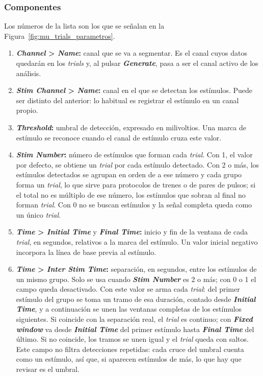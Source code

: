 \documentclass[11pt,a4paper]{article}
\begin{document}
    \subsubsection*{Componentes}
    Los n\'umeros de la lista son los que se se\~nalan en la Figura~\ref{fig:mu_trials_parametros}.
    \begin{enumerate}[label=(\arabic*)]
        \item \textbf{\textit{Channel} > \textit{Name}:} canal que se va a segmentar. Es el canal cuyos datos quedar\'an en los \textit{trials} y, al pulsar \textbf{\textit{Generate}}, pasa a ser el canal activo de los an\'alisis.
        \item \textbf{\textit{Stim Channel} > \textit{Name}:} canal en el que se detectan los est\'imulos. Puede ser distinto del anterior: lo habitual es registrar el est\'imulo en un canal propio.
        \item \textbf{\textit{Threshold}:} umbral de detecci\'on, expresado en milivoltios. Una marca de est\'imulo se reconoce cuando el canal de est\'imulo cruza este valor.
        \item \textbf{\textit{Stim Number}:} n\'umero de est\'imulos que forman cada \textit{trial}. Con 1, el valor por defecto, se obtiene un \textit{trial} por cada est\'imulo detectado. Con 2 o m\'as, los est\'imulos detectados se agrupan en orden de a ese n\'umero y cada grupo forma un \textit{trial}, lo que sirve para protocolos de trenes o de pares de pulsos; si el total no es m\'ultiplo de ese n\'umero, los est\'imulos que sobran al final no forman \textit{trial}. Con 0 no se buscan est\'imulos y la se\~nal completa queda como un \'unico \textit{trial}.
        \item \textbf{\textit{Time} > \textit{Initial Time}} y \textbf{\textit{Final Time}:} inicio y fin de la ventana de cada \textit{trial}, en segundos, relativos a la marca del est\'imulo. Un valor inicial negativo incorpora la l\'inea de base previa al est\'imulo.
        \item \textbf{\textit{Time} > \textit{Inter Stim Time}:} separaci\'on, en segundos, entre los est\'imulos de un mismo grupo. Solo se usa cuando \textbf{\textit{Stim Number}} es 2 o m\'as; con 0 o 1 el campo queda desactivado. Con este valor se arma cada \textit{trial}: del primer est\'imulo del grupo se toma un tramo de esa duraci\'on, contado desde \textbf{\textit{Initial Time}}, y a continuaci\'on se unen las ventanas completas de los est\'imulos siguientes. Si coincide con la separaci\'on real, el \textit{trial} es continuo; con \textbf{\textit{Fixed window}} va desde \textbf{\textit{Initial Time}} del primer est\'imulo hasta \textbf{\textit{Final Time}} del \'ultimo. Si no coincide, los tramos se unen igual y el \textit{trial} queda con saltos. Este campo no filtra detecciones repetidas: cada cruce del umbral cuenta como un est\'imulo, as\'i que, si aparecen est\'imulos de m\'as, lo que hay que revisar es el umbral.

\end{enumerate}
\end{document}
